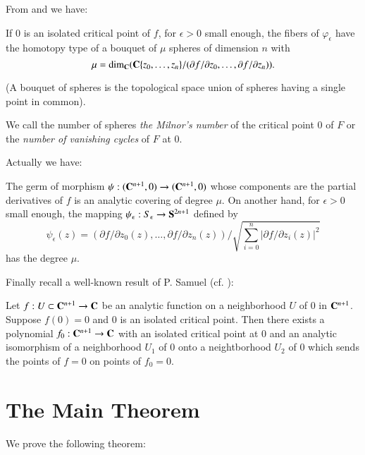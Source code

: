 From \cite{art10-key9} and \cite{art10-key11} we have:

\begin{thm}\label{art10-thm1.5}
If 0 is an isolated critical point of $f$, for $\epsilon > 0$ small enough, the fibers of $\varphi_\epsilon$ have the homotopy type of a bouquet of $\mu$ spheres of dimension $n$ with
$$
\mu = \dim_{\mathbf{C}} (\mathbf{C}\{z_0, \ldots, z_n\}/ (\partial f/ \partial z_0, \ldots, \partial f/ \partial z_n)).
$$
\end{thm}

(A bouquet of spheres is the topological space union of spheres having a single point in common).

We call the number of spheres {\em the Milnor's number} of the critical point 0 of $F$ or the {\em number of vanishing cycles} of $F$ at 0.

Actually we have:


\begin{prop}\label{art10-prop1.6}
The germ of morphism $\psi: (\mathbf{C}^{n+1},0) \to (\mathbf{C}^{n+1},0)$ whose components are the partial derivatives of $f$ is an analytic covering of degree $\mu$. On another hand, for $\epsilon > 0$ small enough, the mapping $\psi_\epsilon: S_\epsilon \to \mathbf{S}^{2n+1}$ defined by 
$$
\psi_\epsilon (z) = (\partial f / \partial z_0 (z), \ldots, \partial f / \partial z_n(z)) \Big/\sqrt{\sum\limits^n_{i=0} | \partial f / \partial z_i (z)|^2}
$$
has the degree $\mu$.
\end{prop}

Finally recall a well-known result of P. Samuel (cf. \cite{art10-key12}):

\begin{thm}\label{art10-thm1.7}
Let $f : U \subset \mathbf{C}^{n+1} \to \mathbf{C}$ be an analytic function on a neighborhood $U$ of 0 in $\mathbf{C}^{n+1}$. Suppose $f(0)=0$ and 0 is an isolated critical point.  Then there exists a polynomial $f_0 : \mathbf{C}^{n+1} \to \mathbf{C}$ with an isolated critical point at 0 and an analytic isomorphism of a neighborhood $U_1$ of 0 onto a neightborhood $U_2$ of 0 which sends the points of $f =0$ on points of $f_0 =0$.
\end{thm}

\section{The Main Theorem}\label{art10-sec2}
We prove the following theorem:

